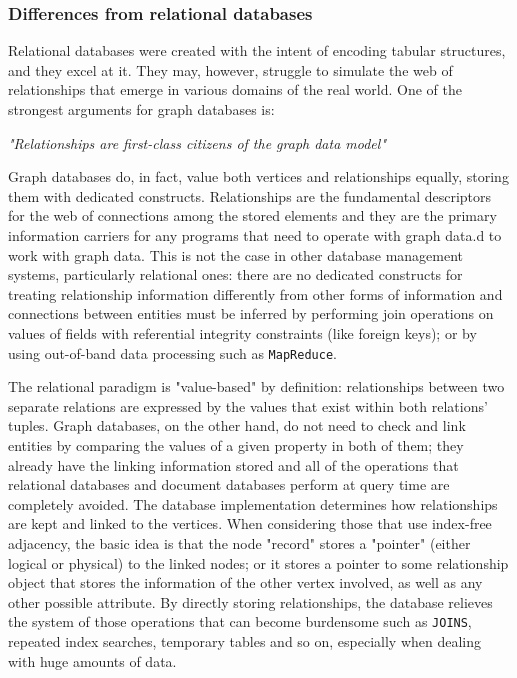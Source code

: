 \subsubsection{Differences from relational databases} \label{subsubsection:LiteratureReview/ReviewofGraphDatabaseSystems/Graphdatabasecharacteristics/Differencesfromrelationaldatabases}
Relational databases were created with the intent of encoding tabular structures, and they excel at it.
They may, however, struggle to simulate the web of relationships that emerge in various domains of the real world.
One of the strongest arguments for graph databases is:
\begin{quoting}[begintext={}, endtext={}]
	\centering\textit{"Relationships are first-class citizens of the graph data model"}
\end{quoting}
Graph databases do, in fact, value both vertices and relationships equally, storing them with dedicated constructs.
Relationships are the fundamental descriptors for the web of connections among the stored elements and they are the primary information carriers for any programs that need to operate with graph data.d to work with graph data. 
This is not the case in other database management systems, particularly relational ones:
there are no dedicated constructs for treating relationship information differently from other forms of information and connections between entities must be inferred by performing join operations on values of fields with referential integrity constraints (like foreign keys);
or by using out-of-band data processing such as \texttt{MapReduce}.

The relational paradigm is "value-based" by definition:
relationships between two separate relations are expressed by the values that exist within both relations' tuples.
Graph databases, on the other hand, do not need to check and link entities by comparing the values of a given property in both of them;
they already have the linking information stored and all of the operations that relational databases and document databases perform at query time are completely avoided.
The database implementation determines how relationships are kept and linked to the vertices.
When considering those that use index-free adjacency, the basic idea is that the node "record" stores a "pointer" (either logical or physical) to the linked nodes;
or it stores a pointer to some relationship object that stores the information of the other vertex involved, as well as any other possible attribute.
By directly storing relationships, the database relieves the system of those operations that can become burdensome such as \texttt{JOINS}, repeated index searches, temporary tables and so on, especially when dealing with huge amounts of data.


